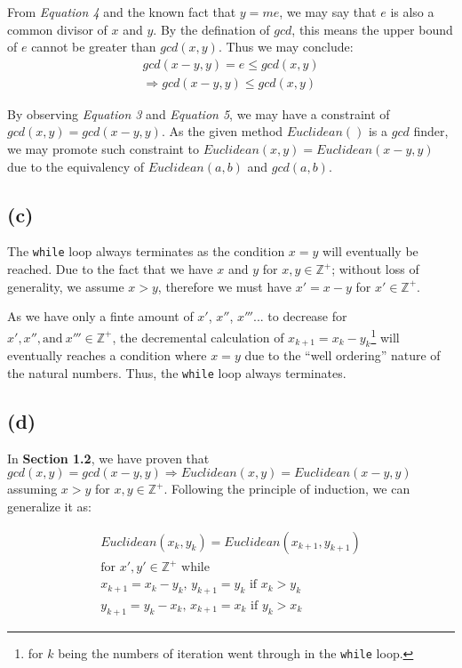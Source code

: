 \documentclass[12pt]{article}
\newcommand{\inlinecode}{\texttt}
\begin{document}
From \textit{Equation 4} and the known fact that $y = me$, we may say that $e$ is also a common divisor of $x$ and $y$. By the defination of $gcd$, this means the upper bound of $e$ cannot be greater than $gcd(x, y)$. Thus we may conclude:
\begin{gather}
    gcd(x-y, y) = e \leq gcd(x, y) \nonumber  \\
    \Rightarrow gcd(x-y, y) \leq gcd(x, y)
\end{gather}

By observing \textit{Equation 3} and \textit{Equation 5}, we may have a constraint of $gcd(x, y) = gcd(x-y, y)$. As the given method $Euclidean()$ is a $gcd$ finder, we may promote such constraint to $Euclidean(x, y) = Euclidean(x - y, y)$ due to the equivalency of $Euclidean(a, b)$ and $gcd(a, b)$.

\subsection{(c)}

The \inlinecode{while} loop always terminates as the condition $x = y$ will eventually be reached. Due to the fact that we have $x$ and $y$ for $x, y \in \mathbb{Z^+}$; without loss of generality, we assume $x > y$, therefore we must have $x' = x - y$ for $x' \in \mathbb{Z^+}$.

As we have only a finte amount of $x'$, $x''$, $x'''$... to decrease for $x', x'', \text{and}\ x''' \in \mathbb{Z^+}$, the decremental calculation of $x_{k+1} = x_{k} - y_{k}$\footnote{for $k$ being the numbers of iteration went through in the \inlinecode{while} loop.} will eventually reaches a condition where $x = y$ due to the ``well ordering'' nature of the natural numbers. Thus, the \inlinecode{while} loop always terminates.

\subsection{(d)}

In \textbf{Section 1.2}, we have proven that $gcd(x, y) = gcd(x-y, y) \Rightarrow Euclidean(x, y) = Euclidean(x - y, y)$ assuming $x > y$ for $x, y \in \mathbb{Z^+}$. Following the principle of induction, we can generalize it as:

\begin{gather}
    Euclidean(x_k, y_k) = Euclidean(x_{k+1}, y_{k+1}) \\
    \text{for $x', y' \in \mathbb{Z^+}$ while } \nonumber \\
    \text{$x_{k+1} = x_{k} - y_{k}$, $y_{k+1} = y_{k}$ \ \ \  if $x_{k} > y_{k}$} \nonumber \\
    \text{$y_{k+1} = y_{k} - x_{k}$, $x_{k+1} = x_{k}$ \ \ \  if $y_{k} > x_{k}$} \nonumber
\end{gather}
\end{document}
